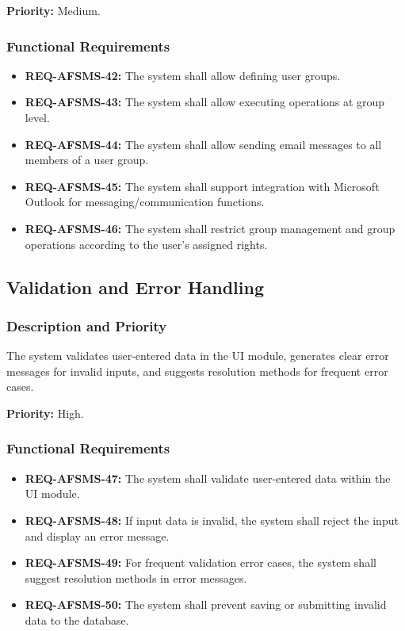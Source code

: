 \documentclass[11pt, a4paper]{article}
\begin{document}
\textbf{Priority:} Medium.

\subsubsection{Functional Requirements}
\begin{itemize}
    \item \textbf{REQ-AFSMS-42:} The system shall allow defining user groups.
    \item \textbf{REQ-AFSMS-43:} The system shall allow executing operations at group level.
    \item \textbf{REQ-AFSMS-44:} The system shall allow sending email messages to all members of a user group.
    \item \textbf{REQ-AFSMS-45:} The system shall support integration with Microsoft Outlook for messaging/communication functions.
    \item \textbf{REQ-AFSMS-46:} The system shall restrict group management and group operations according to the user's assigned rights.
\end{itemize}

\subsection{Validation and Error Handling}

\subsubsection{Description and Priority}
The system validates user-entered data in the UI module, generates clear error messages for invalid inputs, and suggests resolution methods for frequent error cases.

\textbf{Priority:} High.

\subsubsection{Functional Requirements}
\begin{itemize}
    \item \textbf{REQ-AFSMS-47:} The system shall validate user-entered data within the UI module.
    \item \textbf{REQ-AFSMS-48:} If input data is invalid, the system shall reject the input and display an error message.
    \item \textbf{REQ-AFSMS-49:} For frequent validation error cases, the system shall suggest resolution methods in error messages.
    \item \textbf{REQ-AFSMS-50:} The system shall prevent saving or submitting invalid data to the database.
\end{itemize}
\end{document}

